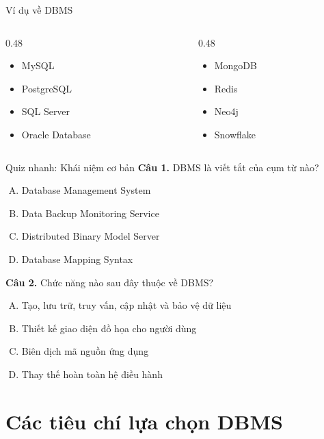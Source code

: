 \documentclass[aspectratio=169,11pt]{beamer}
\newcommand{\smallitem}{\setlength{\itemsep}{2pt}\setlength{\parskip}{0pt}}
\begin{document}
\begin{frame}{Ví dụ về DBMS}
\begin{columns}[T]
\begin{column}{0.48\textwidth}
\begin{itemize}
  \smallitem
  \item MySQL
  \item PostgreSQL
  \item SQL Server
  \item Oracle Database
\end{itemize}
\end{column}
\begin{column}{0.48\textwidth}
\begin{itemize}
  \smallitem
  \item MongoDB
  \item Redis
  \item Neo4j
  \item Snowflake
\end{itemize}
\end{column}
\end{columns}
\end{frame}

\begin{frame}{Quiz nhanh: Khái niệm cơ bản}
\small
\textbf{Câu 1.} DBMS là viết tắt của cụm từ nào?
\begin{enumerate}[A.]
  \item Database Management System
  \item Data Backup Monitoring Service
  \item Distributed Binary Model Server
  \item Database Mapping Syntax
\end{enumerate}

\textbf{Câu 2.} Chức năng nào sau đây thuộc về DBMS?
\begin{enumerate}[A.]
  \item Tạo, lưu trữ, truy vấn, cập nhật và bảo vệ dữ liệu
  \item Thiết kế giao diện đồ họa cho người dùng
  \item Biên dịch mã nguồn ứng dụng
  \item Thay thế hoàn toàn hệ điều hành
\end{enumerate}
\end{frame}

\section{Các tiêu chí lựa chọn DBMS}
\end{document}
